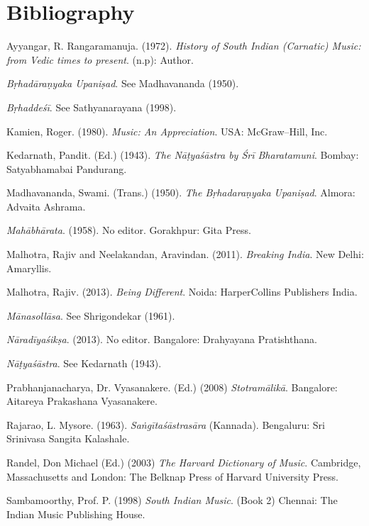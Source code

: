 \section*{Bibliography}

\begin{thebibliography}{99}
 Ayyangar, R. Rangaramanuja. (1972). \textit{History of South Indian (Carnatic) Music: from Vedic times to present}. (n.p): Author.

  \textit{Bṛhadāraṇyaka Upaniṣad}. See Madhavananda (1950).

  \textit{Bṛhaddeśī}. See Sathyanarayana (1998).

  Kamien, Roger. (1980). \textit{Music: An Appreciation}. USA: McGraw–Hill, Inc.

  Kedarnath, Pandit. (Ed.) (1943). \textit{The Nāṭyaśāstra by Śrī Bharatamuni}. Bombay: Satyabhamabai Pandurang.

  Madhavananda, Swami. (Trans.) (1950). \textit{The Bṛhadaraṇyaka Upaniṣad}. Almora: Advaita Ashrama.

  \textit{Mahābhārata}. (1958). No editor. Gorakhpur: Gita Press.

  Malhotra, Rajiv and Neelakandan, Aravindan. (2011). \textit{Breaking India}. New Delhi: Amaryllis.

  Malhotra, Rajiv. (2013). \textit{Being Different}. Noida: HarperCollins Publishers India.

  \textit{Mānasollāsa}. See Shrigondekar (1961).

  \textit{Nāradīyaśikṣa}. (2013). No editor. Bangalore: Drahyayana Pratishthana.

  \textit{Nāṭyaśāstra}. See Kedarnath (1943).

  Prabhanjanacharya, Dr. Vyasanakere. (Ed.) (2008) \textit{Stotramālikā}. Bangalore: Aitareya Prakashana Vyasanakere.

  Rajarao, L. Mysore. (1963). \textit{Saṅgītaśāstrasāra} (Kannada). Bengaluru: Sri Srinivasa Sangita Kalashale.

  Randel, Don Michael (Ed.) (2003) \textit{The Harvard Dictionary of Music}. Cambridge, Massachusetts and London: The Belknap Press of Harvard University Press.

  Sambamoorthy, Prof. P. (1998) \textit{South Indian Music}. (Book 2) Chennai: The Indian Music Publishing House.


\end{thebibliography}
